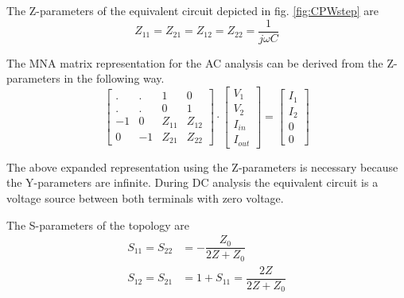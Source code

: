 \addvspace{12pt}

The Z-parameters of the equivalent circuit depicted in
fig. \ref{fig:CPWstep} are
\begin{equation}
Z_{11} = Z_{21} = Z_{12} = Z_{22} = \dfrac{1}{j\omega C}
\end{equation}

The MNA matrix representation for the AC analysis can be derived from
the Z-parameters in the following way.
\begin{equation}
\begin{bmatrix}
 . & .  & 1  & 0 \\
 . & .  &  0 & 1 \\
-1 &  0 & Z_{11} & Z_{12}\\
 0 & -1 & Z_{21} & Z_{22}
\end{bmatrix}
\cdot
\begin{bmatrix}
V_{1}\\
V_{2}\\
I_{in}\\
I_{out}
\end{bmatrix}
=
\begin{bmatrix}
I_{1}\\
I_{2}\\
0\\
0
\end{bmatrix}
\end{equation}

The above expanded representation using the Z-parameters is necessary
because the Y-parameters are infinite.  During DC analysis the
equivalent circuit is a voltage source between both terminals with
zero voltage.

\addvspace{12pt}

The S-parameters of the topology are
\begin{align}
S_{11} = S_{22} &= -\dfrac{Z_0}{2 Z + Z_0}\\
S_{12} = S_{21} &= 1 + S_{11} = \dfrac{2 Z}{2 Z + Z_0}
\end{align}
